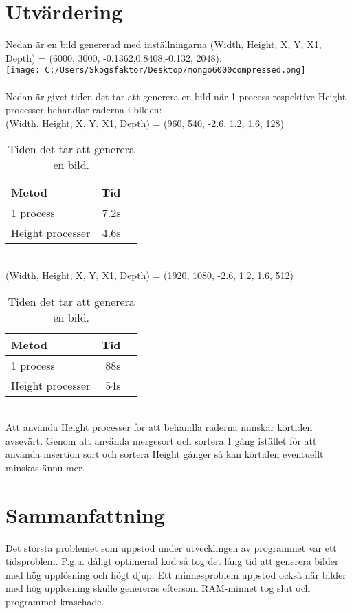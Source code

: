 \documentclass[a4paper, 11pt]{article}
\begin{document}
\section{Utvärdering}
Nedan är en bild genererad med inställningarna (Width, Height, X, Y, X1, Depth) = (6000, 3000, -0.1362,0.8408,-0.132, 2048):
\\\texttt{[image: C:/Users/Skogsfaktor/Desktop/mongo6000compressed.png]}
\\\\Nedan är givet tiden det tar att generera en bild när 1 process respektive Height processer behandlar raderna i bilden:
\\(Width, Height, X, Y, X1, Depth) = (960, 540, -2.6, 1.2, 1.6, 128)
\begin{table}[h]
\centering
\begin{tabular}{|l|r|r|}  
\hline
Metod & Tid\\
\hline
1 process & 7.2s\\
\hline
Height processer & 4.6s\\
\hline
\end{tabular}
\caption{Tiden det tar att generera en bild.}
\label{tab:results}
\end{table}
\\(Width, Height, X, Y, X1, Depth) = (1920, 1080, -2.6, 1.2, 1.6, 512)
\begin{table}[h]
\centering
\begin{tabular}{|l|r|r|}  
\hline
Metod & Tid\\
\hline
1 process & 88s\\
\hline
Height processer & 54s\\
\hline
\end{tabular}
\caption{Tiden det tar att generera en bild.}
\label{tab:results}
\end{table}
\\Att använda Height processer för att behandla raderna minskar körtiden avsevärt. Genom att använda mergesort och sortera 1 gång  istället för att använda insertion sort och sortera Height gånger så kan körtiden eventuellt minskas ännu mer. 
\section{Sammanfattning}
Det största problemet som uppstod under utvecklingen av programmet var ett tidsproblem. P.g.a. dåligt optimerad kod så tog det lång tid att generera bilder med hög upplösning och högt djup. Ett minnesproblem uppstod också när bilder med hög upplösning skulle genereras eftersom RAM-minnet tog slut och programmet kraschade. 
\end{document}
